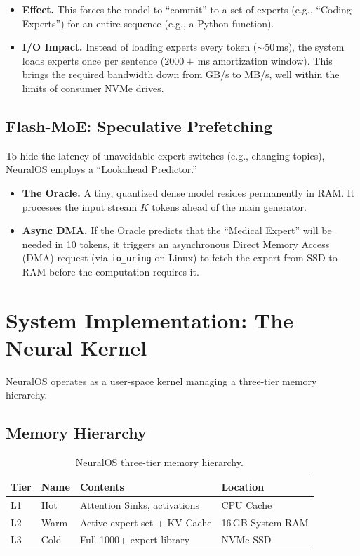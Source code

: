 \documentclass[11pt,twocolumn]{article}
\begin{document}
\begin{itemize}
    \item \textbf{Effect.} This forces the model to ``commit'' to a set of experts (e.g., ``Coding Experts'') for an entire sequence (e.g., a Python function).
    \item \textbf{I/O Impact.} Instead of loading experts every token (${\sim}50$\,ms), the system loads experts once per sentence ($2000+$\,ms amortization window). This brings the required bandwidth down from GB/s to MB/s, well within the limits of consumer NVMe drives.
\end{itemize}

\subsection{Flash-MoE: Speculative Prefetching}

To hide the latency of unavoidable expert switches (e.g., changing topics), NeuralOS employs a ``Lookahead Predictor.''

\begin{itemize}
    \item \textbf{The Oracle.} A tiny, quantized dense model resides permanently in RAM. It processes the input stream $K$ tokens ahead of the main generator.
    \item \textbf{Async DMA.} If the Oracle predicts that the ``Medical Expert'' will be needed in 10 tokens, it triggers an asynchronous Direct Memory Access (DMA) request (via \texttt{io\_uring} on Linux) to fetch the expert from SSD to RAM before the computation requires it.
\end{itemize}

\section{System Implementation: The Neural Kernel}

NeuralOS operates as a user-space kernel managing a three-tier memory hierarchy.

\subsection{Memory Hierarchy}

\begin{table}[h]
\centering
\caption{NeuralOS three-tier memory hierarchy.}
\label{tab:memory-hierarchy}
\begin{tabular}{@{}llll@{}}
\toprule
\textbf{Tier} & \textbf{Name} & \textbf{Contents} & \textbf{Location} \\
\midrule
L1 & Hot    & Attention Sinks, activations    & CPU Cache     \\
L2 & Warm   & Active expert set + KV Cache    & 16\,GB System RAM \\
L3 & Cold   & Full 1000+ expert library       & NVMe SSD      \\
\bottomrule
\end{tabular}
\end{table}
\end{document}
